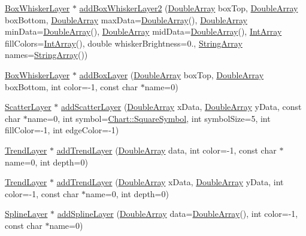\begin{DoxyCompactItemize}
\item 
\hyperlink{class_box_whisker_layer}{Box\+Whisker\+Layer} $\ast$ \hyperlink{class_x_y_chart_a43f380553d11ccc29b1e06dbaa85f49b}{add\+Box\+Whisker\+Layer2} (\hyperlink{class_double_array}{Double\+Array} box\+Top, \hyperlink{class_double_array}{Double\+Array} box\+Bottom, \hyperlink{class_double_array}{Double\+Array} max\+Data=\hyperlink{class_double_array}{Double\+Array}(), \hyperlink{class_double_array}{Double\+Array} min\+Data=\hyperlink{class_double_array}{Double\+Array}(), \hyperlink{class_double_array}{Double\+Array} mid\+Data=\hyperlink{class_double_array}{Double\+Array}(), \hyperlink{class_int_array}{Int\+Array} fill\+Colors=\hyperlink{class_int_array}{Int\+Array}(), double whisker\+Brightness=0., \hyperlink{class_string_array}{String\+Array} names=\hyperlink{class_string_array}{String\+Array}())
\item 
\hyperlink{class_box_whisker_layer}{Box\+Whisker\+Layer} $\ast$ \hyperlink{class_x_y_chart_aebd2b49d3385ac147314eabcd87ebf9c}{add\+Box\+Layer} (\hyperlink{class_double_array}{Double\+Array} box\+Top, \hyperlink{class_double_array}{Double\+Array} box\+Bottom, int color=-\/1, const char $\ast$name=0)
\item 
\hyperlink{chartdir_8h_a012c369aef1d4ea8815a24da953964f2}{Scatter\+Layer} $\ast$ \hyperlink{class_x_y_chart_ad4f8da077a27f9331cd73009a269555b}{add\+Scatter\+Layer} (\hyperlink{class_double_array}{Double\+Array} x\+Data, \hyperlink{class_double_array}{Double\+Array} y\+Data, const char $\ast$name=0, int symbol=\hyperlink{namespace_chart_a5392f7ff9dd37b8e092b2fe17dfb7d05acdc3a84456f3b4b382e714302650ecaa}{Chart\+::\+Square\+Symbol}, int symbol\+Size=5, int fill\+Color=-\/1, int edge\+Color=-\/1)
\item 
\hyperlink{class_trend_layer}{Trend\+Layer} $\ast$ \hyperlink{class_x_y_chart_ab6eacb1530fecf9d3498b6880c5f1944}{add\+Trend\+Layer} (\hyperlink{class_double_array}{Double\+Array} data, int color=-\/1, const char $\ast$name=0, int depth=0)
\item 
\hyperlink{class_trend_layer}{Trend\+Layer} $\ast$ \hyperlink{class_x_y_chart_ae9624399cb7a23fc40f2321706766a25}{add\+Trend\+Layer} (\hyperlink{class_double_array}{Double\+Array} x\+Data, \hyperlink{class_double_array}{Double\+Array} y\+Data, int color=-\/1, const char $\ast$name=0, int depth=0)
\item 
\hyperlink{class_spline_layer}{Spline\+Layer} $\ast$ \hyperlink{class_x_y_chart_ab4d1ef2ffefdf99a52fb8b26b884deab}{add\+Spline\+Layer} (\hyperlink{class_double_array}{Double\+Array} data=\hyperlink{class_double_array}{Double\+Array}(), int color=-\/1, const char $\ast$name=0)

\end{DoxyCompactItemize}

